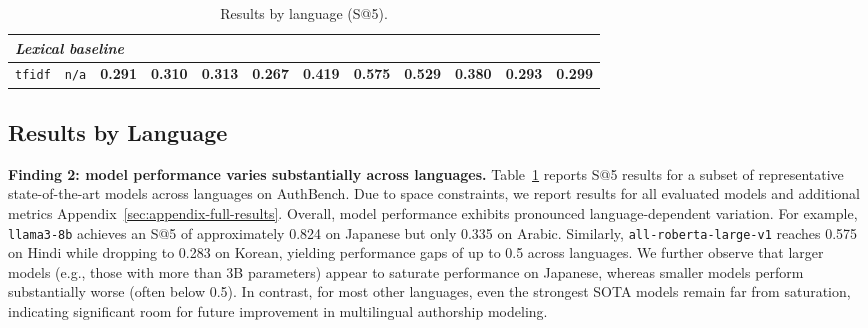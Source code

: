 \documentclass{article}
\begin{document}
\begin{table}[h!]
{\begin{tabular}{lccccccccccc}
\midrule
\multicolumn{12}{l}{\textit{Lexical baseline}} \\
\midrule
\texttt{tfidf} & \texttt{n/a} & \textbf{0.291} & \textbf{0.310} & \textbf{0.313} & \textbf{0.267} & \textbf{0.419} & \textbf{0.575} & \textbf{0.529} & \textbf{0.380} & \textbf{0.293} & \textbf{0.299} \\
\bottomrule
\end{tabular}
}
\caption{Results by language (S@5).
}
\label{tab:lang-s10-top}
\end{table}

\subsection{Results by Language}
\textbf{Finding 2: model performance varies substantially across languages.}
Table~\ref{tab:lang-s10-top} reports S@5 results for a subset of representative state-of-the-art models across languages on AuthBench. Due to space constraints, we report results for all evaluated models and additional metrics Appendix~\ref{sec:appendix-full-results}. Overall, model performance exhibits pronounced language-dependent variation. For example, \texttt{llama3-8b} achieves an S@5 of approximately 0.824 on Japanese but only 0.335 on Arabic. Similarly, \texttt{all-roberta-large-v1} reaches 0.575 on Hindi while dropping to 0.283 on Korean, yielding performance gaps of up to 0.5 across languages. 
We further observe that larger models (e.g., those with more than 3B parameters) appear to saturate performance on Japanese, whereas smaller models perform substantially worse (often below 0.5). In contrast, for most other languages, even the strongest SOTA models remain far from saturation, indicating significant room for future improvement in multilingual authorship modeling.
\end{document}
